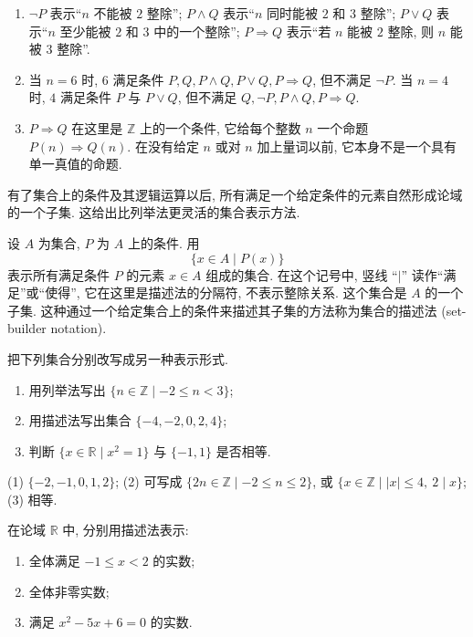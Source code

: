\documentclass[usesamecnt, thmcnt=section, lang=cn, newtx, 10pt, scheme=chinese]{elegantbook}
\begin{document}
\begin{solution}
\begin{enumerate}[label=\rm(\arabic*)]
  \item $\neg P$ 表示``$n$ 不能被 $2$ 整除''; $P\wedge Q$ 表示``$n$ 同时能被 $2$ 和 $3$ 整除''; $P\vee Q$ 表示``$n$ 至少能被 $2$ 和 $3$ 中的一个整除''; $P\Rightarrow Q$ 表示``若 $n$ 能被 $2$ 整除, 则 $n$ 能被 $3$ 整除''.
  \item 当 $n=6$ 时, $6$ 满足条件 $P,Q,P\wedge Q,P\vee Q,P\Rightarrow Q$, 但不满足 $\neg P$. 当 $n=4$ 时, $4$ 满足条件 $P$ 与 $P\vee Q$, 但不满足 $Q,\neg P,P\wedge Q,P\Rightarrow Q$.
  \item $P\Rightarrow Q$ 在这里是 $\mathbb Z$ 上的一个条件, 它给每个整数 $n$ 一个命题 $P(n)\Rightarrow Q(n)$. 在没有给定 $n$ 或对 $n$ 加上量词以前, 它本身不是一个具有单一真值的命题.
\end{enumerate}
\end{solution}

有了集合上的条件及其逻辑运算以后, 所有满足一个给定条件的元素自然形成论域的一个子集. 这给出比列举法更灵活的集合表示方法.

\begin{definition}[描述法]\label{def:sets-builder}
设 $A$ 为集合, $P $ 为 $A$ 上的条件. 用
\[
 \{x\in A\mid P(x)\}
\]
表示所有满足条件 $P $ 的元素 $x\in A$ 组成的集合. 在这个记号中, 竖线 ``$\mid$'' 读作``满足''或``使得'', 它在这里是描述法的分隔符, 不表示整除关系. 这个集合是 $A$ 的一个子集. 这种通过一个给定集合上的条件来描述其子集的方法称为集合的{\color{blue}描述法 (set-builder notation)}.
\end{definition}

\begin{concept}\label{con:sets-07}
把下列集合分别改写成另一种表示形式.
\begin{enumerate}[label=\rm(\arabic*)]
  \item 用列举法写出 $\{n\in\mathbb Z\mid -2\leq n<3\}$;
  \item 用描述法写出集合 $\{-4,-2,0,2,4\}$;
  \item 判断 $\{x\in\mathbb R\mid x^2=1\}$ 与 $\{-1,1\}$ 是否相等.
\end{enumerate}
\end{concept}

\begin{solution}
(1) $\{-2,-1,0,1,2\}$; (2) 可写成 $\{2n\in\mathbb Z\mid -2\leq n\leq2\}$, 或 $\{x\in\mathbb Z\mid |x|\leq4,\ 2\mid x\}$; (3) 相等.
\end{solution}

\begin{exercise}\label{ex:sets-builder-01}
在论域 $\mathbb R$ 中, 分别用描述法表示:
\begin{enumerate}[label=\rm(\arabic*)]
  \item 全体满足 $-1\leq x<2$ 的实数;
  \item 全体非零实数;
  \item 满足 $x^2-5x+6=0$ 的实数.
\end{enumerate}
\end{exercise}
\end{document}
